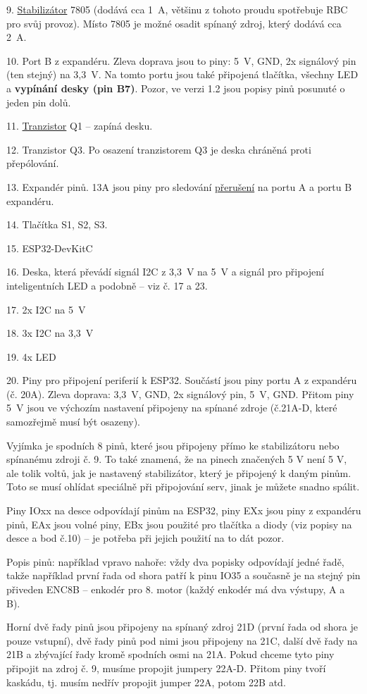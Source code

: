 9.  \hyperref[stabilizator]{Stabilizátor} 7805 (dodává cca 1~A, většinu z tohoto proudu spotřebuje RBC pro svůj provoz). Místo 7805 je možné osadit spínaný zdroj, který dodává cca 2~A.

10. Port B z expandéru. 
Zleva doprava jsou to piny: 5~V, GND, 2x signálový pin (ten stejný) na 3,3~V.
Na tomto portu jsou také připojená tlačítka, všechny LED a \textbf{vypínání desky (pin B7)}. Pozor, ve verzi 1.2 jsou popisy pinů posunuté o jeden pin dolů.

11. \hyperref[tranzistor]{Tranzistor} Q1 -- zapíná desku. 

12.  Tranzistor Q3. Po osazení tranzistorem Q3 je deska chráněná proti přepólování.

13. Expandér pinů.
13A jsou piny pro sledování  \hyperref[preruseni]{přerušení}  na portu A a portu B expandéru. 

14. Tlačítka S1, S2, S3. 

15. ESP32-DevKitC

16. Deska, která převádí signál I2C z 3,3~V na 5~V a signál pro připojení inteligentních LED a podobně -- viz č. 17 a 23.

17. 2x I2C na 5~V

18. 3x I2C na 3,3~V

19. 4x LED 

20. Piny pro připojení periferií k ESP32. 
Součástí jsou piny portu A z expandéru (č. 20A). 
Zleva doprava: 3,3~V, GND, 2x signálový pin, 5~V, GND. 
Přitom piny 5~V jsou ve výchozím nastavení připojeny na spínané zdroje (č.21A-D, které samozřejmě musí být osazeny). 

Vyjímka je spodních 8 pinů,
které jsou připojeny přímo ke stabilizátoru nebo spínanému zdroji č. 9. To
také znamená, že na pinech značených 5 V není 5 V, ale tolik voltů, jak
je nastavený stabilizátor, který je připojený k daným pinům. Toto se musí
ohlídat speciálně při připojování serv, jinak je můžete snadno spálit.

Piny IOxx na desce odpovídají pinům na ESP32, piny EXx jsou piny z expandéru pinů, 
EAx jsou volné piny, EBx jsou použité pro tlačítka a diody
(viz popisy na desce a bod č.10) – je potřeba při jejich použití na to dát
pozor.

Popis pinů: například vpravo nahoře: vždy dva popisky odpovídají jedné
řadě, takže například první řada od shora patří k pinu IO35 a současně je na
stejný pin přiveden ENC8B – enkodér pro 8. motor (každý enkodér má dva
výstupy, A a B).

Horní dvě řady pinů jsou připojeny na spínaný zdroj 21D (první řada od
shora je pouze vstupní), dvě řady pinů pod nimi jsou připojeny na 21C,
další dvě řady na 21B a zbývající řady kromě spodních osmi na 21A. Pokud
chceme tyto piny připojit na zdroj č. 9, musíme propojit jumpery 22A-D.
Přitom piny tvoří kaskádu, tj. musím nedřív propojit jumper 22A, potom
22B atd.

